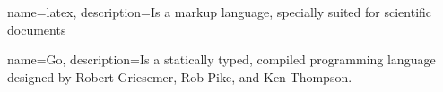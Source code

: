 
{
    name=latex,
    description={Is a markup language, specially suited for scientific documents}
}

{
    name=Go,
    description={Is a statically typed, compiled programming language designed by Robert Griesemer, Rob Pike, and Ken Thompson.}
}
